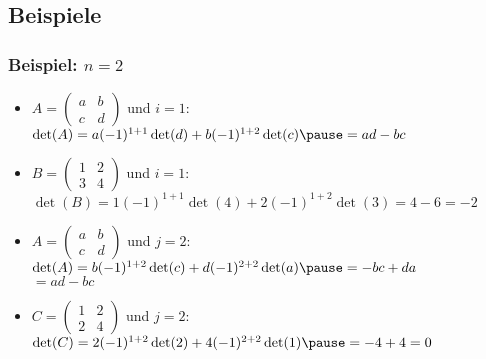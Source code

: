 \subsection{Beispiele}
%
\begin{frame}\frametitle{Beispiel: $n=2$}
\begin{itemize}
\item $A=\begin{pmatrix} a & b \\ c & d \end{pmatrix}$ und $i=1$:\pause \\ \vspace{1mm}$\det(A)=a(-1)^{1+1}\det(d)+b(-1)^{1+2}\det(c)\pause=ad-bc$
\pause \vfill
\item $B=\begin{pmatrix} 1 & 2 \\ 3 & 4 \end{pmatrix}$ und $i=1$:\pause \\ \vspace{1mm}$\det(B)=1(-1)^{1+1}\det(4)+2(-1)^{1+2}\det(3)=4-6=-2$
\pause \vfill
\item $A=\begin{pmatrix} a & b \\ c & d \end{pmatrix}$ und $j=2$:\pause \\ \vspace{1mm}$\det(A)=b(-1)^{1+2}\det(c)+d(-1)^{2+2}\det(a)\pause=-bc+da$\\\hspace{11.75mm}$=ad-bc$
\pause \vfill
\item $C=\begin{pmatrix} 1 & 2 \\ 2 & 4 \end{pmatrix}$ und $j=2$:\pause \\ \vspace{1mm}$\det(C)=2(-1)^{1+2}\det(2)+4(-1)^{2+2}\det(1)\pause=-4+4=0$
\end{itemize}
\end{frame}
%
%
